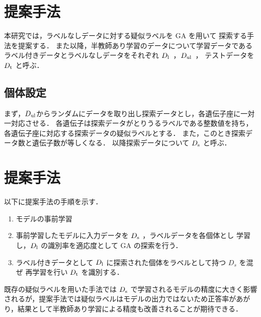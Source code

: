 
\newpage
\changeindent{0cm}
\section{提案手法}
\changeindent{2cm}
本研究では，ラベルなしデータに対する疑似ラベルを GA を用いて
探索する手法を提案する．
また以降，半教師あり学習のデータについて学習データである
ラベル付きデータとラベルなしデータをそれぞれ $D_{\rm l}$\ ，$D_{\rm ul}$\ ，
テストデータを $D_{\rm t}$ と呼ぶ．


\changeindent{0cm}
\subsection{個体設定}
\changeindent{2cm}
まず，$D_{\rm ul}$からランダムにデータを取り出し探索データとし，各遺伝子座に一対一対応させる．
各遺伝子は探索データがとりうるラベルである整数値を持ち，
各遺伝子座に対応する探索データの疑似ラベルとする．
また，このとき探索データ数と遺伝子数が等しくなる．
以降探索データについて $D_{\rm s}$ と呼ぶ．

\changeindent{0cm}
\section{提案手法}
\changeindent{2cm}
以下に提案手法の手順を示す．

\begin{enumerate}
	\item モデルの事前学習
	\item 事前学習したモデルに入力データを $D_{\rm s}$ ，ラベルデータを各個体とし
	学習し，$D_{\rm l}$ の識別率を適応度として GA の探索を行う．
	\item ラベル付きデータとして $D_{\rm l}$ に探索された個体をラベルとして持つ $D_{s}$ を混ぜ
	再学習を行い $D_{\rm t}$ を識別する．
\end{enumerate}

既存の疑似ラベルを用いた手法では $D_{\rm s}$ で学習されるモデルの精度に大きく影響されるが，提案手法では疑似ラベルはモデルの出力ではないため正答率があがり，結果として半教師あり学習による精度も改善されることが期待できる．

